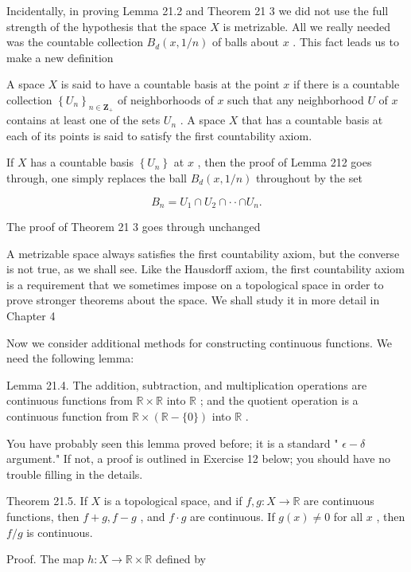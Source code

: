 \documentclass[10pt]{article}
\begin{document}
Incidentally, in proving Lemma 21.2 and Theorem 21 3 we did not use the full strength of the hypothesis that the space \(X\) is metrizable. All we really needed was the countable collection \({B}_{d}\left( {x,1/n}\right)\) of balls about \(x\) . This fact leads us to make a new definition

A space \(X\) is said to have a countable basis at the point \(x\) if there is a countable collection \({\left\{  {U}_{n}\right\}  }_{n \in  {\mathbf{Z}}_{ + }}\) of neighborhoods of \(x\) such that any neighborhood \(U\) of \(x\) contains at least one of the sets \({U}_{n}\) . A space \(X\) that has a countable basis at each of its points is said to satisfy the first countability axiom.

If \(X\) has a countable basis \(\left\{  {U}_{n}\right\}\) at \(x\) , then the proof of Lemma 212 goes through, one simply replaces the ball \({B}_{d}\left( {x,1/n}\right)\) throughout by the set

\[
{B}_{n} = {U}_{1} \cap  {U}_{2} \cap   \cdot   \cdot   \cap  {U}_{n}.
\]

The proof of Theorem 21 3 goes through unchanged

A metrizable space always satisfies the first countability axiom, but the converse is not true, as we shall see. Like the Hausdorff axiom, the first countability axiom is a requirement that we sometimes impose on a topological space in order to prove stronger theorems about the space. We shall study it in more detail in Chapter 4

Now we consider additional methods for constructing continuous functions. We need the following lemma:

Lemma 21.4. The addition, subtraction, and multiplication operations are continuous functions from \(\mathbb{R} \times  \mathbb{R}\) into \(\mathbb{R}\) ; and the quotient operation is a continuous function from \(\mathbb{R} \times  \left( {\mathbb{R}-\{ 0\} }\right)\) into \(\mathbb{R}\) .

You have probably seen this lemma proved before; it is a standard " \(\epsilon  - \delta\) argument." If not, a proof is outlined in Exercise 12 below; you should have no trouble filling in the details.

Theorem 21.5. If \(X\) is a topological space, and if \(f,g : X \rightarrow  \mathbb{R}\) are continuous functions, then \(f + g,f - g\) , and \(f \cdot  g\) are continuous. If \(g\left( x\right)  \neq  0\) for all \(x\) , then \(f/g\) is continuous.

Proof. The map \(h : X \rightarrow  \mathbb{R} \times  \mathbb{R}\) defined by
\end{document}
